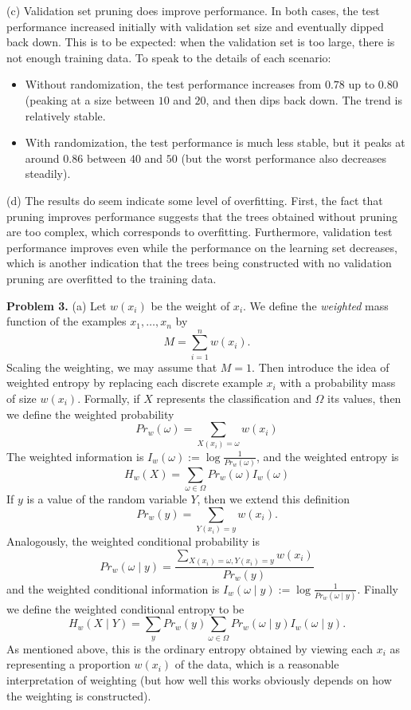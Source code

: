 \documentclass[12pt]{amsart}
\theoremstyle{remark}
\begin{document}
(c) Validation set pruning does improve performance. In both cases, the test performance increased initially with validation set size and eventually dipped back down. This is to be expected: when the validation set is too large, there is not enough training data. To speak to the details of each scenario:

\begin{itemize}
\item Without randomization, the test performance increases from $0.78$ up to $0.80$ (peaking at a size between $10$ and $20$, and then dips back down. The trend is relatively stable. 
\item With randomization, the test performance is much less stable, but it peaks at around $0.86$ between $40$ and $50$ (but the worst performance also decreases steadily). 
\end{itemize}

(d) The results do seem indicate some level of overfitting. First, the fact that pruning improves performance suggests that the trees obtained without pruning are too complex, which corresponds to overfitting. Furthermore, validation test performance improves even while the performance on the learning set decreases, which is another indication that the trees being constructed with no validation pruning are overfitted to the training data. 
\newpage

\noindent \textbf{Problem 3.} (a)  Let $w(x_i)$ be the weight of $x_i$. We define the \emph{weighted} mass function of the examples $x_1, \ldots, x_n$ by 
\[
M = \sum_{i=1}^n w(x_i). 
\]
Scaling the weighting, we may assume that $M=1$. Then introduce the idea of weighted entropy by replacing each discrete example $x_i$ with a probability mass of size $w(x_i)$. Formally, if $X$ represents the classification and $\Omega$ its values, then we define the weighted probability 
\[
Pr_w(\omega) = \sum_{X(x_i) = \omega} w(x_i) 
\]
The weighted information is $I_w(\omega)  := \log \frac{1}{Pr_w(\omega)}$, and the weighted entropy is 
\[
H_w(X) = \sum_{\omega \in \Omega} Pr_w(\omega) I_w(\omega)
\]
If $y$ is a value of the random variable $Y$, then we extend this definition 
\[
Pr_w(y) = \sum_{Y(x_i) = y} w(x_i).
\]
Analogously, the weighted conditional probability is 
\[
Pr_w(\omega \mid y) =\frac{ \sum_{X(x_i) = \omega, Y(x_i) = y} w(x_i)}{Pr_w(y)}
\]
and the weighted conditional information is $I_w(\omega \mid y ) := \log \frac{1}{Pr_w(\omega \mid y)}$. 
Finally we define the weighted conditional entropy to be  
\[
H_w(X \mid Y) = \sum_y Pr_w(y) \sum_{\omega \in \Omega} Pr_w(\omega \mid y) I_w(\omega \mid y).
\]
As mentioned above, this is the ordinary entropy obtained by viewing each $x_i$ as representing a proportion $w(x_i)$ of the data, which is a reasonable interpretation of weighting (but how well this works obviously depends on how the weighting is constructed). 
\end{document}

